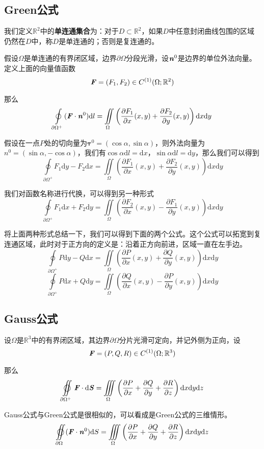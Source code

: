 \documentclass[UTF8,openany]{book}
\begin{document}
	\subsection{Green公式}
	\par 我们定义$\mathbb{R}^2$中的\textbf{单连通集合}为：对于$D\subset\mathbb{R}^2$，如果$D$中任意封闭曲线包围的区域仍然在$D$中，称$D$是单连通的；否则是复连通的。
	\par 假设$\Omega$是单连通的有界闭区域，边界$\partial\Omega$分段光滑，设$\textbf{\textit{n}}^0$是边界的单位外法向量。定义上面的向量值函数
	$$\textbf{\textit{F}}=(F_1,F_2)\in C^{(1)}(\Omega;\mathbb{R}^2)$$
	\par 那么
	$$\oint\limits_{\partial\Omega^+}(\textbf{\textit{F}}\cdot\textbf{\textit{n}}^0)\mathrm{d}l=
	\iint\limits_{\Omega}\left(\frac{\partial F_1}{\partial x}(x,y)+\frac{\partial F_2}{\partial y}(x,y)\right)\mathrm{d}x\mathrm{d}y$$
	\par 假设在一点$P$处的切向量为$\boldsymbol{\tau}^0=(\cos\alpha,\sin\alpha)$，则外法向量为$n^0=(\sin\alpha,-\cos\alpha)$，我们有$\cos\alpha\mathrm{d}l=\mathrm{d}x$，$\sin\alpha\mathrm{d}l=\mathrm{d}y$，那么我们可以得到
	$$\oint\limits_{\partial\Omega^+}F_1\mathrm{d}y-F_2\mathrm{d}x=
	\iint\limits_{\Omega}\left(\frac{\partial F_1}{\partial x}(x,y)+\frac{\partial F_2}{\partial y}(x,y)\right)\mathrm{d}x\mathrm{d}y$$
	\par 我们对函数名称进行代换，可以得到另一种形式
	$$\oint\limits_{\partial\Omega^+}F_1\mathrm{d}x+F_2\mathrm{d}y=
	\iint\limits_{\Omega}\left(\frac{\partial F_2}{\partial x}(x,y)-\frac{\partial F_1}{\partial y}(x,y)\right)\mathrm{d}x\mathrm{d}y$$
	\par 将上面两种形式总结一下，我们可以得到下面的两个公式。这个公式可以拓宽到复连通区域，此时对于正方向的定义是：沿着正方向前进，区域一直在左手边。
	$$\oint\limits_{\partial\Omega^+}P\mathrm{d}y-Q\mathrm{d}x=
	\iint\limits_{\Omega}\left(\frac{\partial P}{\partial x}(x,y)+\frac{\partial Q}{\partial y}(x,y)\right)\mathrm{d}x\mathrm{d}y$$
	$$\oint\limits_{\partial\Omega^+}P\mathrm{d}x+Q\mathrm{d}y=
	\iint\limits_{\Omega}\left(\frac{\partial Q}{\partial x}(x,y)-\frac{\partial P}{\partial y}(x,y)\right)\mathrm{d}x\mathrm{d}y$$
	\subsection{Gauss公式}
	\par 设$\Omega$是$\mathbb{R}^3$中的有界闭区域，其边界$\partial\Omega$分片光滑可定向，并记外侧为正向，设
	$$\textbf{\textit{F}}=(P,Q,R)\in C^{(1)}(\Omega;\mathbb{R}^3)$$
	\par 那么
	$$\varoiint\limits_{\partial\Omega^+}\textbf{\textit{F}}\cdot\mathrm{d}\textbf{\textit{S}}=\iiint\limits_{\Omega}\left(\frac{\partial P}{\partial x}+\frac{\partial Q}{\partial y}+\frac{\partial R}{\partial z}\right)\mathrm{d}x\mathrm{d}y\mathrm{d}z$$
	\par Gauss公式与Green公式是很相似的，可以看成是Green公式的三维情形。
	$$\varoiint\limits_{\partial\Omega}(\textbf{\textit{F}}\cdot\textbf{\textit{n}}^0)\mathrm{d}S=\iiint\limits_{\Omega}\left(\frac{\partial P}{\partial x}+\frac{\partial Q}{\partial y}+\frac{\partial R}{\partial z}\right)\mathrm{d}x\mathrm{d}y\mathrm{d}z$$
\end{document}

